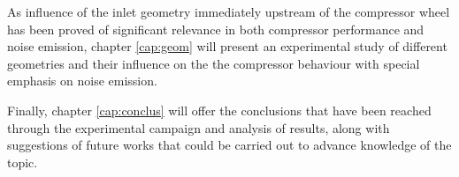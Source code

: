As influence of the inlet geometry immediately upstream of the compressor wheel has been proved of significant relevance in both compressor performance and noise emission, chapter \ref{cap:geom} will present an experimental study of different geometries and their influence on the the compressor behaviour with special emphasis on noise emission.

Finally, chapter \ref{cap:conclus} will offer the conclusions that have been reached through the experimental campaign and analysis of results, along with suggestions of future works that could be carried out to advance knowledge of the topic.